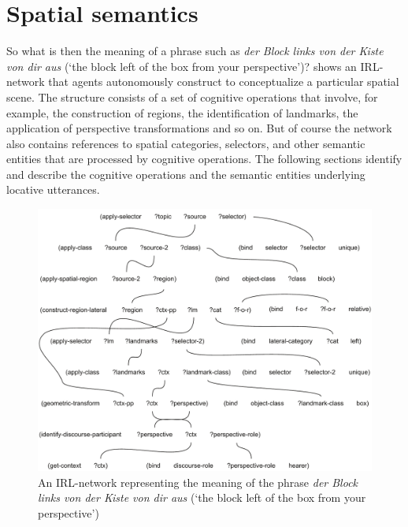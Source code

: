\chapter{Spatial semantics}
\label{s:german-space-semantics}
So what is then the meaning of a phrase such as 
\textit{der Block links von der Kiste von dir aus} 
(`the block left of the box from your perspective')?
shows an IRL-network that agents autonomously construct to conceptualize
a particular spatial scene. The structure consists
of a set of cognitive operations that involve, for example, the construction of regions, 
the identification of landmarks, the application of perspective transformations and so on. But of course the network also contains references to spatial
categories, selectors, and other semantic entities that are processed by cognitive
operations. The following sections identify and describe the cognitive operations
and the semantic entities underlying locative utterances.

\begin{figure}
\includegraphics[width=\textwidth]{figs/semantic-structure-der-block-links-der-kiste-von-dir-aus}
\caption[Semantic structure of the phrase
\textit{der Block links von der Kiste von dir aus} 
(`the block left of the box from your perspective')]{%
An IRL-network representing the meaning of the phrase 
\textit{der Block links von der Kiste von dir aus} 
(`the block left of the box from your perspective')}
\label{f:semantic-structure-der-block-links-der-kiste-von-dir-aus}
\end{figure}

